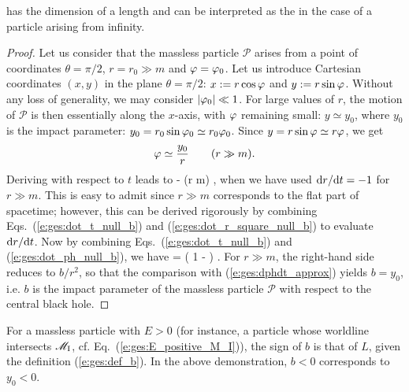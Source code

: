 has the dimension of a length and can be interpreted as the
 in the case of a
particle arising from infinity.
\begin{proof}
Let us consider that the massless
particle $\mathscr{P}$ arises from a point of coordinates $\theta=\pi/2$,
$r=r_0 \gg m$ and $\varphi = \varphi_0$.  Let us introduce
Cartesian coordinates $(x,y)$ in the plane $\theta=\pi/2$:
$x:=r\cos\varphi$ and $y:=r\sin\varphi$.
Without any loss of generality, we may
consider $|\varphi_0| \ll 1$. For large values of $r$, the motion of
$\mathscr{P}$ is then essentially along the $x$-axis, with $\varphi$ remaining small:
$y\simeq y_0$, where  $y_0$ is the impact parameter:
$y_0 = r_0 \sin\varphi_0 \simeq r_0 \varphi_0$. Since $y=r\sin\varphi\simeq r\varphi$, we get
\[
    \varphi \simeq \frac{y_0}{r} \qquad (r \gg m) .
\]
Deriving with respect to $t$ leads to
\be \label{e:ges:dphdt_approx}
     \simeq -  
                  \simeq {}  \qquad (r \gg m) ,
\ee
when we have used $\mathrm{d} r / \mathrm{d} t = - 1$ for $r \gg m$. This is easy
to admit since
$r\gg m$ corresponds to the flat part of spacetime; however, this can be derived
rigorously by combining Eqs.~(\ref{e:ges:dot_t_null_b}) and
(\ref{e:ges:dot_r_square_null_b}) to evaluate $\mathrm{d} r / \mathrm{d} t$.
Now by combining Eqs.~(\ref{e:ges:dot_t_null_b}) and (\ref{e:ges:dot_ph_null_b}),
we have
\be
     =  \left( 1 -  \right) .
\ee
For $r\gg m$, the right-hand side reduces to $b/r^2$, so that the comparison
with (\ref{e:ges:dphdt_approx}) yields $b = y_0$, i.e. $b$ is the impact
parameter of the massless particle $\mathscr{P}$ with respect to the central
black hole.
\end{proof}

\begin{remark}
For a massless particle with $E>0$ (for instance, a particle whose
worldline intersects $\mathscr{M}_{\rm I}$, cf. Eq.~(\ref{e:ges:E_positive_M_I})),
the sign of $b$ is that of $L$, given the definition (\ref{e:ges:def_b}).
In the above demonstration, $b<0$ corresponds to $y_0<0$.
\end{remark}

